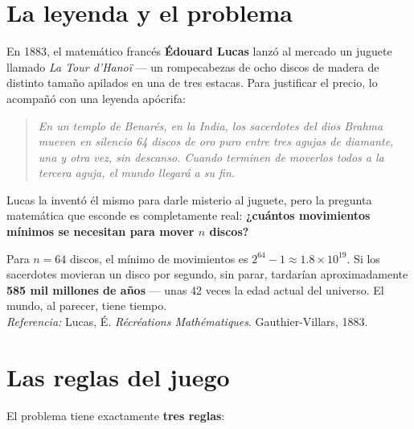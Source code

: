 \documentclass[12pt, oneside]{article}
\begin{document}

\tableofcontents
\newpage

\section{La leyenda y el problema}

En 1883, el matemático francés \textbf{Édouard Lucas} lanzó al mercado un
juguete llamado \textit{La Tour d'Hanoï} — un rompecabezas de ocho discos
de madera de distinto tamaño apilados en una de tres estacas.
Para justificar el precio, lo acompañó con una leyenda apócrifa:

\begin{quote}
\textit{En un templo de Benarés, en la India, los sacerdotes del dios Brahma
mueven en silencio 64 discos de oro puro entre tres agujas de diamante,
una y otra vez, sin descanso.  Cuando terminen de moverlos todos a la
tercera aguja, el mundo llegará a su fin.}
\end{quote}

Lucas la inventó él mismo para darle misterio al juguete, pero la pregunta
matemática que esconde es completamente real:
\textbf{¿cuántos movimientos mínimos se necesitan para mover $n$ discos?}

\begin{tecnico}
  Para $n = 64$ discos, el mínimo de movimientos es $2^{64} - 1
  \approx 1.8 \times 10^{19}$.
  Si los sacerdotes movieran un disco por segundo, sin parar, tardarían
  aproximadamente \textbf{585 mil millones de años} — unas 42 veces la edad
  actual del universo.  El mundo, al parecer, tiene tiempo.\\
  \textit{Referencia:} Lucas, É. \textit{Récréations Mathématiques}.
  Gauthier-Villars, 1883.
\end{tecnico}

\section{Las reglas del juego}

El problema tiene exactamente \textbf{tres reglas}:
\end{document}
